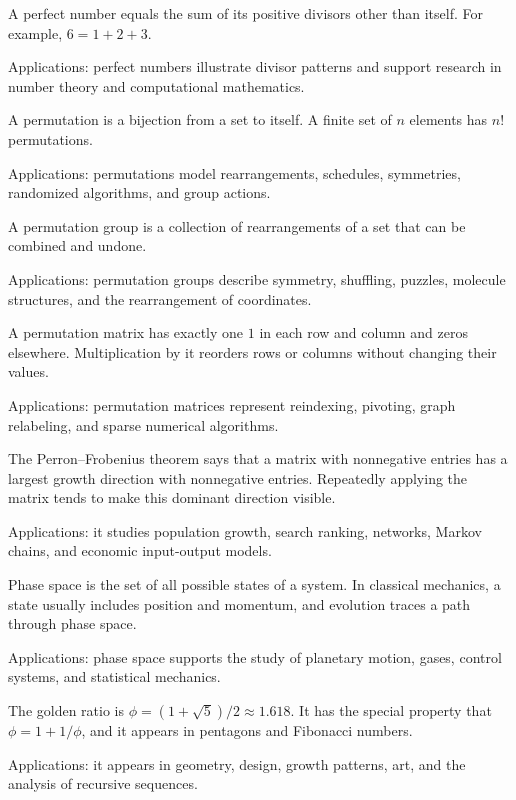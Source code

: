 A perfect number equals the sum of its positive divisors other than itself. For example, $6=1+2+3$. \par\noindent Applications: perfect numbers illustrate divisor patterns and support research in number theory and computational mathematics.

A permutation is a bijection from a set to itself. A finite set of $n$ elements has $n!$ permutations. \par\noindent Applications: permutations model rearrangements, schedules, symmetries, randomized algorithms, and group actions.

A permutation group is a collection of rearrangements of a set that can be combined and undone. \par\noindent Applications: permutation groups describe symmetry, shuffling, puzzles, molecule structures, and the rearrangement of coordinates.

A permutation matrix has exactly one $1$ in each row and column and zeros elsewhere. Multiplication by it reorders rows or columns without changing their values. \par\noindent Applications: permutation matrices represent reindexing, pivoting, graph relabeling, and sparse numerical algorithms.

The Perron--Frobenius theorem says that a matrix with nonnegative entries has a largest growth direction with nonnegative entries. Repeatedly applying the matrix tends to make this dominant direction visible. \par\noindent Applications: it studies population growth, search ranking, networks, Markov chains, and economic input-output models.

Phase space is the set of all possible states of a system. In classical mechanics, a state usually includes position and momentum, and evolution traces a path through phase space. \par\noindent Applications: phase space supports the study of planetary motion, gases, control systems, and statistical mechanics.

The golden ratio is $\phi=(1+\sqrt5)/2\approx1.618$. It has the special property that $\phi=1+1/\phi$, and it appears in pentagons and Fibonacci numbers. \par\noindent Applications: it appears in geometry, design, growth patterns, art, and the analysis of recursive sequences.

